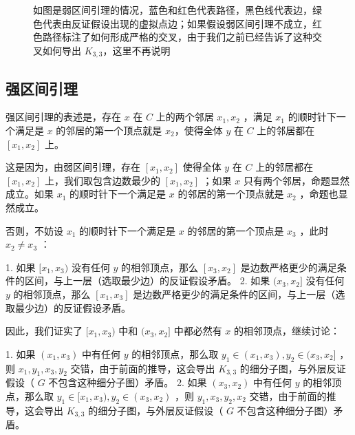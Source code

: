 \documentclass[11pt, a4paper]{ctexart}
\begin{document}
\begin{figure}[H]
    \caption{如图是弱区间引理的情况，蓝色和红色代表路径，黑色线代表边，绿色代表由反证假设出现的虚拟点边；如果假设弱区间引理不成立，红色路径标注了如何形成严格的交叉，由于我们之前已经告诉了这种交叉如何导出 $K_{3,3}$，这里不再说明}
\end{figure}

\subsection{强区间引理}
强区间引理的表述是，存在 $x$ 在 $C$ 上的两个邻居 $x_1,x_2$ ，满足 $x_1$ 的顺时针下一个满足是 $x$ 的邻居的第一个顶点就是 $x_2$，使得全体 $y$ 在 $C$ 上的邻居都在 $[x_1,x_2]$ 上。

这是因为，由弱区间引理，存在 $[x_1,x_2]$ 使得全体 $y$ 在 $C$ 上的邻居都在 $[x_1,x_2]$ 上，我们取包含边数最少的 $[x_1,x_2]$ ；如果 $x$ 只有两个邻居，命题显然成立。如果 $x_1$ 的顺时针下一个满足是 $x$ 的邻居的第一个顶点就是 $x_2$ ，命题也显然成立。

否则，不妨设 $x_1$ 的顺时针下一个满足是 $x$ 的邻居的第一个顶点是 $x_3$ ，此时 $x_2\ne x_3$ ：

1. 如果 $[x_1,x_3)$ 没有任何 $y$ 的相邻顶点，那么 $[x_3,x_2]$ 是边数严格更少的满足条件的区间，与上一层（选取最少边）的反证假设矛盾。
2. 如果 $(x_3,x_2]$ 没有任何 $y$ 的相邻顶点，那么 $[x_1,x_3]$ 是边数严格更少的满足条件的区间，与上一层（选取最少边）的反证假设矛盾。

因此，我们证实了 $[x_1,x_3)$ 中和 $(x_3,x_2]$ 中都必然有 $x$ 的相邻顶点，继续讨论：

1. 如果 $(x_1,x_3)$ 中有任何 $y$ 的相邻顶点，那么取 $y_1\in (x_1,x_3),y_2\in (x_3,x_2]$ ，则 $x_1,y_1,x_3,y_2$ 交错，由于前面的推导，这会导出 $K_{3,3}$ 的细分子图，与外层反证假设（ $G$ 不包含这种细分子图）矛盾。
2. 如果 $(x_3,x_2)$ 中有任何 $y$ 的相邻顶点，那么取 $y_1\in [x_1,x_3),y_2\in (x_3,x_2)$ ，则 $y_1,x_3,y_2,x_2$ 交错，由于前面的推导，这会导出 $K_{3,3}$ 的细分子图，与外层反证假设（ $G$ 不包含这种细分子图）矛盾。
\end{document}
